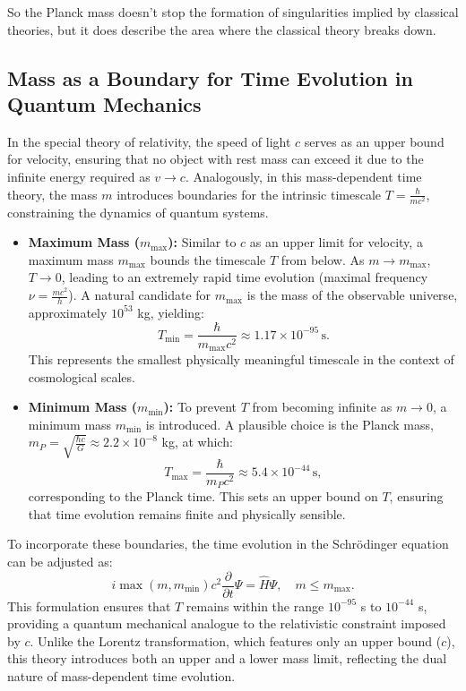 \documentclass{article}
\begin{document}
So the Planck mass doesn't stop the formation of singularities implied by classical theories, but it does describe the area where the classical theory breaks down.

\subsection{Mass as a Boundary for Time Evolution in Quantum Mechanics}

In the special theory of relativity, the speed of light \(c\) serves as an upper bound for velocity, ensuring that no object with rest mass can exceed it due to the infinite energy required as \(v \to c\). Analogously, in this mass-dependent time theory, the mass \(m\) introduces boundaries for the intrinsic timescale \(T = \frac{\hbar}{mc^2}\), constraining the dynamics of quantum systems.

\begin{itemize}
\item \textbf{Maximum Mass (\(m_{\text{max}}\)):} Similar to \(c\) as an upper limit for velocity, a maximum mass \(m_{\text{max}}\) bounds the timescale \(T\) from below. As \(m \to m_{\text{max}}\), \(T \to 0\), leading to an extremely rapid time evolution (maximal frequency \(\nu = \frac{mc^2}{h}\)). A natural candidate for \(m_{\text{max}}\) is the mass of the observable universe, approximately \(10^{53}\) kg, yielding:
\[
T_{\text{min}} = \frac{\hbar}{m_{\text{max}} c^2} \approx 1.17 \times 10^{-95} \, \text{s}.
\]
This represents the smallest physically meaningful timescale in the context of cosmological scales.

\item \textbf{Minimum Mass (\(m_{\text{min}}\)):} To prevent \(T\) from becoming infinite as \(m \to 0\), a minimum mass \(m_{\text{min}}\) is introduced. A plausible choice is the Planck mass, \(m_P = \sqrt{\frac{\hbar c}{G}} \approx 2.2 \times 10^{-8}\) kg, at which:
\[
T_{\text{max}} = \frac{\hbar}{m_P c^2} \approx 5.4 \times 10^{-44} \, \text{s},
\]
corresponding to the Planck time. This sets an upper bound on \(T\), ensuring that time evolution remains finite and physically sensible.
\end{itemize}

To incorporate these boundaries, the time evolution in the Schrödinger equation can be adjusted as:
\[
i \max(m, m_{\text{min}}) c^2 \frac{\partial}{\partial t} \Psi = \hat{H} \Psi, \quad m \leq m_{\text{max}}.
\]
This formulation ensures that \(T\) remains within the range \(10^{-95}\) s to \(10^{-44}\) s, providing a quantum mechanical analogue to the relativistic constraint imposed by \(c\). Unlike the Lorentz transformation, which features only an upper bound (\(c\)), this theory introduces both an upper and a lower mass limit, reflecting the dual nature of mass-dependent time evolution.
\end{document}
